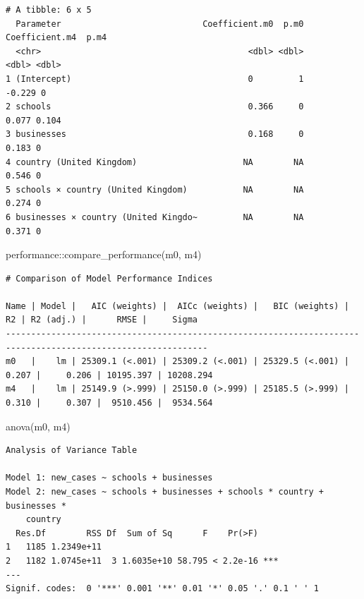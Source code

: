 \documentclass[
  letterpaper,
]{krantz}
\makeatletter
\newenvironment{Shaded}{\begin{snugshade}}{\end{snugshade}}
\newcommand{\FunctionTok}[1]{\textcolor[rgb]{0.28,0.35,0.67}{#1}}
\newcommand{\NormalTok}[1]{\textcolor[rgb]{0.00,0.23,0.31}{#1}}
\newcommand{\SpecialCharTok}[1]{\textcolor[rgb]{0.37,0.37,0.37}{#1}}
\newenvironment{kframe}{%
\medskip{}
\setlength{\fboxsep}{.8em}
 \def\at@end@of@kframe{}%
 \ifinner\ifhmode%
  \def\at@end@of@kframe{\end{minipage}}%
  \begin{minipage}{\columnwidth}%
 \fi\fi%
 \def\FrameCommand##1{\hskip\@totalleftmargin \hskip-\fboxsep
 \colorbox{shadecolor}{##1}\hskip-\fboxsep
     \hskip-\linewidth \hskip-\@totalleftmargin \hskip\columnwidth}%
 \MakeFramed {\advance\hsize-\width
   \@totalleftmargin\z@ \linewidth\hsize
   \@setminipage}}%
 {\par\unskip\endMakeFramed%
 \at@end@of@kframe}
\renewenvironment{Shaded}{\begin{kframe}}{\end{kframe}}
\makeatother
\begin{document}
\begin{verbatim}
# A tibble: 6 x 5
  Parameter                            Coefficient.m0  p.m0 Coefficient.m4  p.m4
  <chr>                                         <dbl> <dbl>          <dbl> <dbl>
1 (Intercept)                                   0         1         -0.229 0    
2 schools                                       0.366     0          0.077 0.104
3 businesses                                    0.168     0          0.183 0    
4 country (United Kingdom)                     NA        NA          0.546 0    
5 schools × country (United Kingdom)           NA        NA          0.274 0    
6 businesses × country (United Kingdo~         NA        NA          0.371 0    
\end{verbatim}

\begin{Shaded}
\begin{Highlighting}[]
\NormalTok{performance}\SpecialCharTok{::}\FunctionTok{compare\_performance}\NormalTok{(m0, m4)}
\end{Highlighting}
\end{Shaded}

\begin{verbatim}
# Comparison of Model Performance Indices

Name | Model |   AIC (weights) |  AICc (weights) |   BIC (weights) |    R2 | R2 (adj.) |      RMSE |     Sigma
--------------------------------------------------------------------------------------------------------------
m0   |    lm | 25309.1 (<.001) | 25309.2 (<.001) | 25329.5 (<.001) | 0.207 |     0.206 | 10195.397 | 10208.294
m4   |    lm | 25149.9 (>.999) | 25150.0 (>.999) | 25185.5 (>.999) | 0.310 |     0.307 |  9510.456 |  9534.564
\end{verbatim}

\begin{Shaded}
\begin{Highlighting}[]
\FunctionTok{anova}\NormalTok{(m0, m4)}
\end{Highlighting}
\end{Shaded}

\begin{verbatim}
Analysis of Variance Table

Model 1: new_cases ~ schools + businesses
Model 2: new_cases ~ schools + businesses + schools * country + businesses * 
    country
  Res.Df        RSS Df  Sum of Sq      F    Pr(>F)    
1   1185 1.2349e+11                                   
2   1182 1.0745e+11  3 1.6035e+10 58.795 < 2.2e-16 ***
---
Signif. codes:  0 '***' 0.001 '**' 0.01 '*' 0.05 '.' 0.1 ' ' 1
\end{verbatim}
\end{document}
